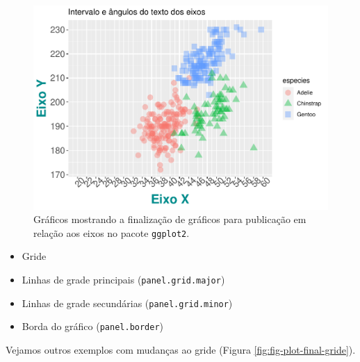 \documentclass[
]{article}
\providecommand{\tightlist}{%
  \setlength{\itemsep}{0pt}\setlength{\parskip}{0pt}}
\begin{document}
\begin{figure}
\centering
\includegraphics{epr_files/figure-latex/fig-plot-final-eixos-fonte-2.pdf}
\caption{\label{fig:fig-plot-final-eixos-fonte-2}Gráficos mostrando a finalização de gráficos para publicação em relação aos eixos no pacote \texttt{ggplot2}.}
\end{figure}

\begin{itemize}
\tightlist
\item
  Gride
\item
  Linhas de grade principais (\texttt{panel.grid.major})
\item
  Linhas de grade secundárias (\texttt{panel.grid.minor})
\item
  Borda do gráfico (\texttt{panel.border})
\end{itemize}

Vejamos outros exemplos com mudanças ao gride (Figura \ref{fig:fig-plot-final-gride}).
\end{document}
